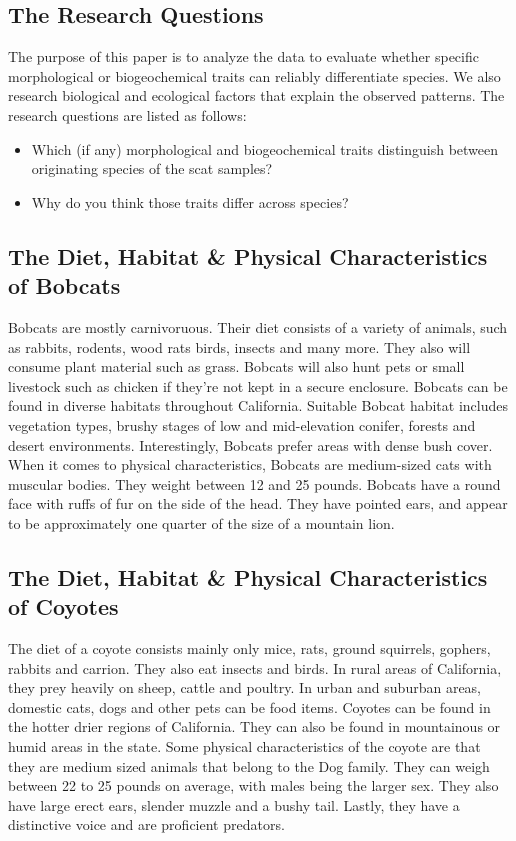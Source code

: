 \documentclass[a4paper]{article}
\begin{document}
\subsection{The Research Questions}
The purpose of this paper is to analyze the data to evaluate whether specific morphological or biogeochemical traits can reliably differentiate species. We 
also research biological and ecological factors that explain the observed patterns. The research questions are listed as follows:
\begin{itemize}
    \item Which (if any) morphological and biogeochemical traits distinguish between originating species of the scat samples?
    \item Why do you think those traits differ across species?
\end{itemize}

\subsection{The Diet, Habitat \& Physical Characteristics of Bobcats}
Bobcats are mostly carnivoruous. Their diet consists of a variety of animals, such as rabbits, rodents, wood rats birds, insects and many more. They also
will consume plant material such as grass. Bobcats will also hunt pets or small livestock such as chicken if they're not kept in a secure enclosure. Bobcats
can be found in diverse habitats throughout California. Suitable Bobcat habitat includes vegetation types, brushy stages of low and mid-elevation conifer, 
forests and desert environments. Interestingly, Bobcats prefer areas with dense bush cover. When it comes to physical characteristics, Bobcats are 
medium-sized cats with muscular bodies. They weight between 12 and 25 pounds. Bobcats have a round face with ruffs of fur on the side of the head. They have
pointed ears, and appear to be approximately one quarter of the size of a mountain lion.

\subsection{The Diet, Habitat \& Physical Characteristics of Coyotes}
The diet of a coyote consists mainly only mice, rats, ground squirrels, gophers, rabbits and carrion. They also eat insects and birds. In rural areas of
California, they prey heavily on sheep, cattle and poultry. In urban and suburban areas, domestic cats, dogs and other pets can be food items. Coyotes can
be found in the hotter drier regions of California. They can also be found in mountainous or humid areas in the state. Some physical characteristics of the 
coyote are that they are medium sized animals that belong to the Dog family. They can weigh between 22 to 25 pounds on average, with males being the larger
sex. They also have large erect ears, slender muzzle and a bushy tail. Lastly, they have a distinctive voice and are proficient predators.
\end{document}
